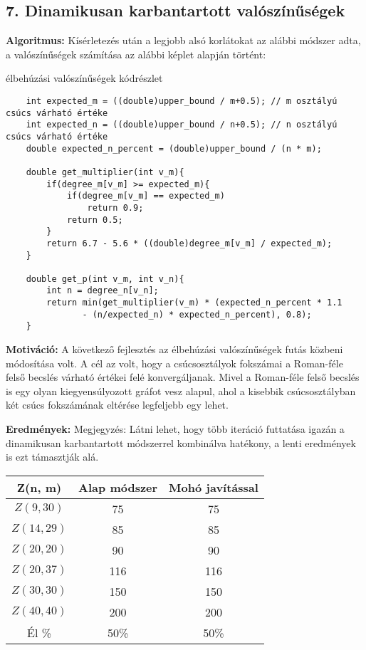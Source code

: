 \documentclass[12pt,a4paper]{article}
\begin{document}
\subsection*{7. Dinamikusan karbantartott valószínűségek}
\textbf{Algoritmus:} Kísérletezés után a legjobb alsó korlátokat az alábbi módszer adta, a valószínűségek számítása az alábbi
képlet alapján történt:
\begin{algorithm}[H]
\caption{élbehúzási valószínűségek kódrészlet}
\begin{verbatim} 
    int expected_m = ((double)upper_bound / m+0.5); // m osztályú csúcs várható értéke
    int expected_n = ((double)upper_bound / n+0.5); // n osztályú csúcs várható értéke
    double expected_n_percent = (double)upper_bound / (n * m);
    
    double get_multiplier(int v_m){
        if(degree_m[v_m] >= expected_m){
            if(degree_m[v_m] == expected_m)
                return 0.9;
            return 0.5;
        }
        return 6.7 - 5.6 * ((double)degree_m[v_m] / expected_m);
    }

    double get_p(int v_m, int v_n){
        int n = degree_n[v_n];
        return min(get_multiplier(v_m) * (expected_n_percent * 1.1
               - (n/expected_n) * expected_n_percent), 0.8);
    }
\end{verbatim}    
\end{algorithm}
\textbf{Motiváció:} A következő fejlesztés az élbehúzási valószínűségek futás közbeni módosítása volt. A cél az volt, hogy a csúcsosztályok fokszámai a Roman-féle felső becslés várható értékei felé konvergáljanak. Mivel a Roman-féle felső becslés is egy olyan kiegyensúlyozott gráfot vesz alapul, ahol a kisebbik csúcsosztályban két csúcs fokszámának eltérése legfeljebb egy lehet.

\textbf{Eredmények:}
Megjegyzés: Látni lehet, hogy több iteráció futtatása igazán a dinamikusan karbantartott módszerrel kombinálva hatékony, a lenti eredmények is ezt támasztják alá.
\begin{table}[H]
\centering
\begin{tabular}{|c|c|c|}
\hline
\textbf{Z(n, m)} & \textbf{Alap módszer} & \textbf{Mohó javítással} \\
\hline
$Z(9,30)$  & 75 & 75 \\
$Z(14, 29)$ & 85 & 85 \\
$Z(20, 20)$ & 90 & 90 \\
$Z(20, 37)$ & 116 & 116 \\
$Z(30, 30)$ & 150 & 150 \\
$Z(40, 40)$ & 200 & 200 \\
\hline
Él \% & 50\% & 50\% \\
\hline
\end{tabular}
\end{table}
\end{document}
